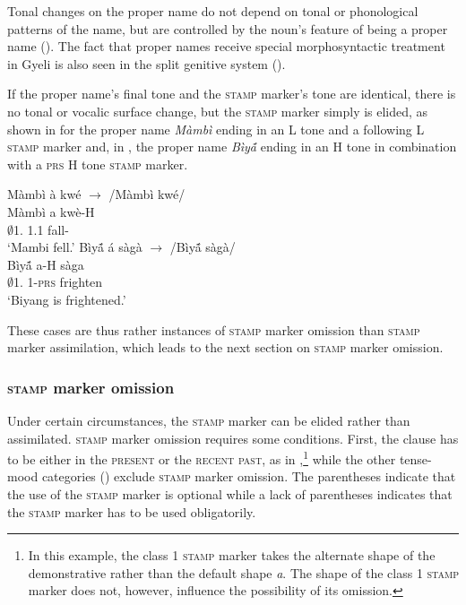 Tonal changes on the proper name do not depend on tonal or phonological patterns of the name, but are controlled by the noun's feature of being a proper name ().  The fact that proper names receive special morphosyntactic treatment in Gyeli is also seen in the split genitive system (). 

If the proper name's final tone and the \textsc{stamp} marker's tone are identical, there is no tonal or vocalic surface change, but the \textsc{stamp} marker simply is elided, as shown in  for  the proper name {\itshape Màmbì} ending in an L tone and a following L \textsc{stamp} marker and, in , the proper name {\itshape Bìyã́} ending in an H tone in combination with a \textsc{prs} H tone \textsc{stamp} marker.


\ea \label{SCOPAs3}
  \ea  \label{SCOPAs3a}
   \glll   Màmbì à kwé   $\rightarrow$ /Màmbì kwé/ \\
          Màmbì a kwè-H \\
            $\emptyset$1.{\PN} 1.{\PST}1 fall-{\PST}  \\
    \trans `Mambi fell.'
\ex\label{SCOPAs3b}
\glll  Bìyã́ á sàgà $\rightarrow$ /Bìyã́ sàgà/ \\
       Bìyã́ a-H sàga \\
           $\emptyset$1.{\PN} 1-\textsc{prs} frighten    \\
    \trans `Biyang is frightened.'
 \z
\z

\noindent These cases are thus rather instances of \textsc{stamp} marker omission than \textsc{stamp} marker assimilation, which leads to the next section on \textsc{stamp} marker omission.



\subsubsection*{\textsc{stamp} marker omission}
Under certain circumstances, the \textsc{stamp} marker can be elided rather than assimilated. \textsc{stamp} marker omission requires some conditions. First, the clause has to be either in the \textsc{present} or the \textsc{recent past}, as in ,\footnote{In this example, the class 1 \textsc{stamp} marker takes the alternate shape of the demonstrative rather than the default shape {\itshape a}. The shape of the class 1 \textsc{stamp} marker does not, however, influence the possibility of its omission.} while the other tense-mood categories () exclude \textsc{stamp} marker omission.  The parentheses indicate that the use of the \textsc{stamp} marker is optional while a lack of parentheses indicates that the \textsc{stamp} marker has to be used obligatorily.

